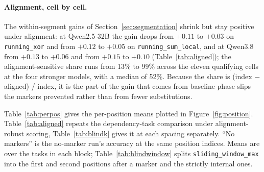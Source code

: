 \documentclass[10pt]{article} %
\newcommand{\task}[1]{\texttt{#1}}
\begin{document}
\paragraph{Alignment, cell by cell.} The within-segment gains of Section~\ref{sec:segmentation} shrink but stay positive under alignment: at Qwen2.5-32B the gain drops from $+0.11$ to $+0.03$ on \task{running\_xor} and from $+0.12$ to $+0.05$ on \task{running\_sum\_local}, and at Qwen3.8 from $+0.13$ to $+0.06$ and from $+0.15$ to $+0.10$ (Table~\ref{tab:aligned}); the alignment-sensitive share runs from 13\% to 99\% across the eleven qualifying cells at the four stronger models, with a median of 52\%. Because the share is (index $-$ aligned) / index, it is the part of the gain that comes from baseline phase slips the markers prevented rather than from fewer substitutions.

Table~\ref{tab:perpos} gives the per-position means plotted in Figure~\ref{fig:position}. Table~\ref{tab:aligned} repeats the dependency-task comparison under alignment-robust scoring, Table~\ref{tab:blindk} gives it at each spacing separately. ``No markers'' is the no-marker run's accuracy at the same position indices. Means are over the tasks in each block; Table~\ref{tab:blindwindow} splits \task{sliding\_window\_max} into the first and second positions after a marker and the strictly internal ones.

\begin{table}[!htbp]
\centering
\small
\caption{Per-position accuracy by model ($N \le 64$, $k \in \{2,4,8,16\}$), mean over the tasks in each block. Bold: post-marker changes of 0.20 or more in size.}
\label{tab:perpos}
\resizebox{0.85\linewidth}{!}{}
\end{table}

\begin{table}[!htbp]
\centering
\small
\caption{\task{sliding\_window\_max} reads the two previous inputs, so the first two positions after a marker cross it. Change against the no-marker run at the same positions for the first position after a marker ($i \bmod k = 0$), the second ($i \bmod k = 1$), and the strictly internal positions ($i \bmod k \ge 2$, only at $k \ge 3$; ---: none at $k = 2$, and $k = 5$ and 6 were run at Qwen2.5-7B and 32B only), by spacing and pooled over $k \in \{2, 4, 8, 16\}$. Positions 0 and 1 of the sequence, which follow no marker, are in none of the classes. Because this task has two crossing positions, the other tables report the mean over both as one post-marker value, which is why their entries for it are smaller in size than the first column here: at Qwen2.5-7B and $k = 2$, for instance, $-0.145$ and $-0.117$ here average to the $-0.131$ that Table~\ref{tab:blindk} prints. Bold: pooled losses of 0.10 or more.}
\label{tab:blindwindow}
\resizebox{0.85\linewidth}{!}{}
\end{table}
\end{document}
